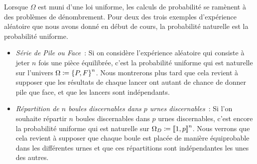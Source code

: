 \documentclass{magnolia}
\begin{document}
  \begin{remarques}
  \remarque Lorsque $\Omega$ est muni d'une loi uniforme, les calculs de probabilité se ramènent à des
    problèmes de dénombrement.
\remarque Pour deux des trois exemples d'expérience aléatoire que nous avons donné
  en début de cours, la probabilité \og naturelle \fg
  est la probabilité uniforme.
    \begin{itemize}
    \item \emph{Série de Pile ou Face}~: Si on considère l'expérience aléatoire qui consiste à jeter $n$ fois une
      pièce équilibrée, c'est la  probabilité uniforme qui est naturelle sur l'univers $\Omega\coloneqq\left\{P,F\right\}^n$. Nous montrerons plus tard que cela
      revient à supposer que les
      résultats de chaque lancer ont autant de chance de donner pile que face, et que les lancers sont indépendants.
    \item \emph{Répartition de $n$ boules discernables dans $p$ urnes discernables}~: Si l'on souhaite répartir
      $n$ boules discernables dans $p$ urnes discernables, c'est encore la
      probabilité uniforme qui est naturelle sur $\Omega_D\coloneqq\left\llbracket 1,p\right\rrbracket^n$. Nous verrons que cela revient à supposer que chaque
      boule est placée de manière équiprobable dans les différentes urnes et que ces répartitions sont indépendantes les unes
      des autres.
    \end{itemize}
  \end{remarques}
\end{document}
